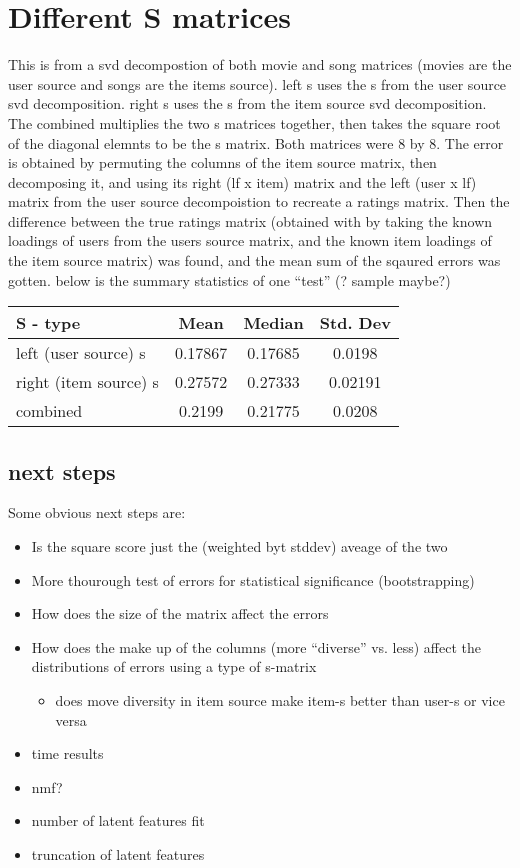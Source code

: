 \documentclass[]{article}
\begin{document}
\section{Different S matrices}
This is from a svd decompostion of both movie and song matrices (movies are the user source and songs are the items source).
left s uses the s from the user source svd decomposition.
right s uses the s from the item source svd decomposition.
The combined multiplies the two s matrices together, then takes the square root of the diagonal elemnts to be the s matrix.
Both matrices were 8 by 8.
The error is obtained by permuting the columns of the item source matrix, then decomposing it, and using its right (lf x item) matrix and the left (user x lf) matrix from the user source decompoistion to recreate a ratings matrix.
Then the difference between the true ratings matrix (obtained with by taking the known loadings of users from the users source matrix, and the known item loadings of the item source matrix) was found, and the mean sum of the sqaured errors was gotten.
below is the summary statistics of one ``test'' (? sample maybe?)\\
\begin{centering}
    \begin{tabular}{l | c | c |c}
        S - type & Mean & Median & Std. Dev \\
\hline
        left (user source) s & 0.17867 & 0.17685 & 0.0198 \\
        right (item source) s & 0.27572 & 0.27333 & 0.02191 \\
        combined & 0.2199 & 0.21775 & 0.0208 \\
\end{tabular}
\end{centering}

\subsection{next steps}
Some obvious next steps are:
\begin{itemize}
    \item Is the square score just the (weighted byt stddev) aveage of the two
    \item More thourough test of errors for statistical significance (bootstrapping)
    \item How does the size of the matrix affect the errors
    \item How does the make up of the columns (more ``diverse'' vs. less) affect the distributions of errors using a type of s-matrix
        \begin{itemize}
            \item does move diversity in item source make item-s better than user-s or vice versa
        \end{itemize}
    \item time results
    \item nmf?
    \item number of latent features fit
    \item truncation of latent features
\end{itemize}
\end{document}
